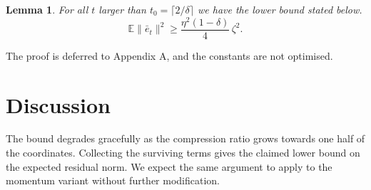\documentclass[10pt,twocolumn]{article}
\newtheorem{lemma}{Lemma}
\newcommand{\s}[1]{#1}
\newcommand{\m}[2]{#1}
\begin{document}
\begin{lemma}
\s{For all \m{$t$}{t} larger than \m{$t_0 = \lceil 2/\delta \rceil$}{t0 = ⌈2/δ⌉} we have the lower bound stated below.}
\begin{equation}
\mathbb{E}\|\bar{e}_t\|^2 \ge \frac{\eta^2 (1-\delta)}{4}\,\zeta^2 .
\end{equation}
\end{lemma}

\s{The proof is deferred to Appendix A, and the constants are not optimised.}

\section{Discussion}
\s{The bound degrades gracefully as the compression ratio grows towards one half of the coordinates.}
\s{Collecting the surviving terms gives the claimed lower bound on the expected residual norm.}
\s{We expect the same argument to apply to the momentum variant without further modification.}
\end{document}
